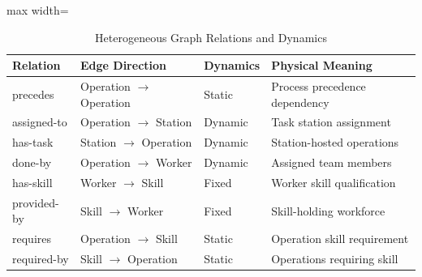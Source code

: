\documentclass[journal,10pt]{IEEEtran}
\renewcommand{\arraystretch}{1.04}
\begin{document}
\begin{table}[!t]
\centering
\caption{Heterogeneous Graph Relations and Dynamics}
\label{tab:relations}
\setlength{\tabcolsep}{3pt}
\renewcommand{\arraystretch}{0.98}
\begin{adjustbox}{max width=\columnwidth}
\begin{tabular}{@{}llll@{}}
\toprule
\textbf{Relation} & \textbf{Edge Direction} & \textbf{Dynamics} & \textbf{Physical Meaning} \\
\midrule
precedes & Operation $\rightarrow$ Operation & Static & Process precedence dependency \\
assigned-to & Operation $\rightarrow$ Station & Dynamic & Task station assignment \\
has-task & Station $\rightarrow$ Operation & Dynamic & Station-hosted operations \\
done-by & Operation $\rightarrow$ Worker & Dynamic & Assigned team members \\
has-skill & Worker $\rightarrow$ Skill & Fixed & Worker skill qualification \\
provided-by & Skill $\rightarrow$ Worker & Fixed & Skill-holding workforce \\
requires & Operation $\rightarrow$ Skill & Static & Operation skill requirement \\
required-by & Skill $\rightarrow$ Operation & Static & Operations requiring skill \\
\bottomrule
\end{tabular}
\end{adjustbox}
\end{table}
\end{document}
